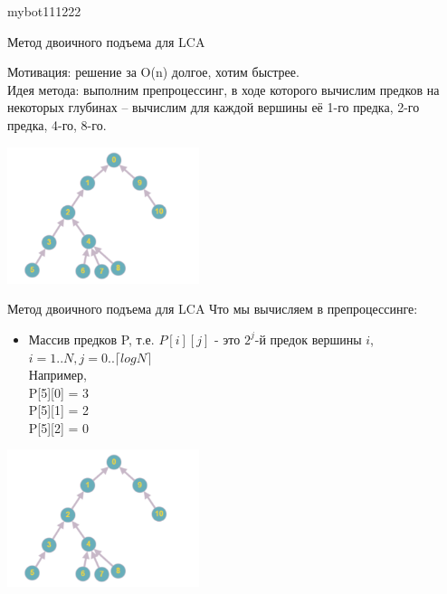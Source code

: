 mybot111222\documentclass[10pt]{beamer}
\begin{document}
\begin{frame}[fragile]{Метод двоичного подъема для LCA}

Мотивация: решение за O(n) долгое, хотим быстрее. \\
Идея метода: выполним препроцессинг, в ходе которого вычислим предков на некоторых глубинах -- вычислим для каждой вершины её 1-го предка, 2-го предка, 4-го, 8-го.

\begin{center}
    \includegraphics[height=4cm]{Term_2/Source/images/10-lca.png}
\end{center}

\end{frame}


\begin{frame}[fragile]{Метод двоичного подъема для LCA}
Что мы вычисляем в препроцессинге:
\begin{itemize}
    \item Массив предков P, т.е. $P[i][j]$ - это $2^j$-й предок вершины $i$, $i = 1..N, j = 0..⌈log N⌉$ \\
Например, \\
P[5][0] = 3 \\
P[5][1] = 2 \\ 
P[5][2] = 0 \\
\end{itemize}
\begin{center}
    \includegraphics[height=4cm]{Term_2/Source/images/10-lca.png}
\end{center}
\end{frame}
\end{document}
